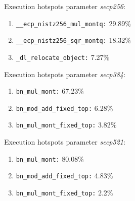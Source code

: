 Execution hotspots parameter \textit{secp256}:
\begin{enumerate}[noitemsep]
	\item \texttt{\_\_ecp\_nistz256\_mul\_montq:} 29.89\%
	\item \texttt{\_\_ecp\_nistz256\_sqr\_montq:} 18.32\%
	\item \texttt{\_dl\_relocate\_object:} 7.27\%
\end{enumerate}
Execution hotspots parameter \textit{secp384}:
\begin{enumerate}[noitemsep]
	\item \texttt{bn\_mul\_mont:} 67.23\%
	\item \texttt{bn\_mod\_add\_fixed\_top:} 6.28\%
	\item \texttt{bn\_mul\_mont\_fixed\_top:} 3.82\%
\end{enumerate}
Execution hotspots parameter \textit{secp521}:
\begin{enumerate}[noitemsep]
	\item \texttt{bn\_mul\_mont:} 80.08\%
	\item \texttt{bn\_mod\_add\_fixed\_top:} 4.83\%
	\item \texttt{bn\_mul\_mont\_fixed\_top:} 2.2\%
\end{enumerate}
